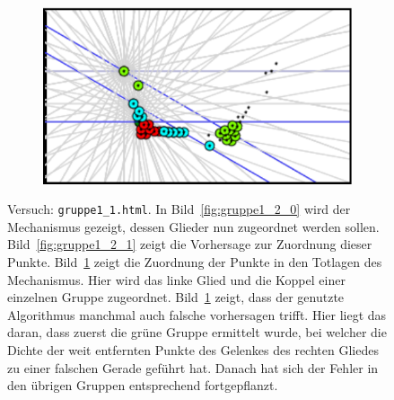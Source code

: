 \begin{figure}
\begin{subfigure}[t]{0.24\textwidth}
        \caption{}
        \label{fig:gruppe1_2_2}
    \end{subfigure}
    \begin{subfigure}[t]{0.24\textwidth}
        \includegraphics[width=\textwidth]{gfx/gruppe1_2_3.png}
        \caption{}
        \label{fig:gruppe1_2_3}
    \end{subfigure}
    \caption{Versuch: \lstinline{gruppe1_1.html}. In Bild~\ref{fig:gruppe1_2_0} wird der Mechanismus gezeigt, dessen Glieder nun zugeordnet werden sollen.
    Bild~\ref{fig:gruppe1_2_1} zeigt die Vorhersage zur Zuordnung dieser Punkte.
    Bild~\ref{fig:gruppe1_2_2} zeigt die Zuordnung der Punkte in den Totlagen des Mechanismus. Hier wird das linke Glied und die Koppel einer einzelnen Gruppe zugeordnet. Bild~\ref{fig:gruppe1_2_2} zeigt, dass der genutzte Algorithmus manchmal auch falsche vorhersagen trifft. Hier liegt das daran, dass zuerst die grüne Gruppe ermittelt wurde, bei welcher die Dichte der weit entfernten Punkte des Gelenkes des rechten Gliedes zu einer falschen Gerade geführt hat. Danach hat sich der Fehler in den übrigen Gruppen entsprechend fortgepflanzt.}
    \label{fig:gruppe1_2}
\end{figure}

